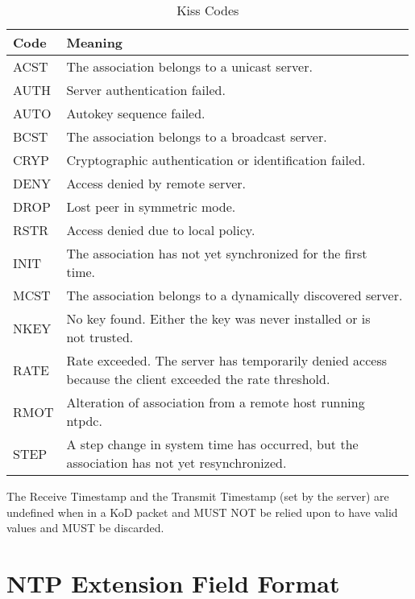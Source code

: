 \begin{table}[htb]
  \center
  \begin{tabular}{| l | l |}
    \hline
    Code & Meaning \\
    \hline
    \hline
    ACST & The association belongs to a unicast server. \\
    AUTH & Server authentication failed. \\
    AUTO & Autokey sequence failed. \\
    BCST & The association belongs to a broadcast server. \\
    CRYP & Cryptographic authentication or identification failed. \\
    DENY & Access denied by remote server. \\
    DROP & Lost peer in symmetric mode. \\
    RSTR & Access denied due to local policy. \\
    INIT & \makecell[l]{The association has not yet synchronized for the first \\ time.} \\
    MCST & The association belongs to a dynamically discovered server.\\
    NKEY & \makecell[l]{No key found. Either the key was never installed or is \\ not trusted.} \\
    RATE & \makecell[l]{Rate exceeded. The server has temporarily denied access \\ because the client exceeded the rate threshold.} \\
    RMOT & \makecell[l]{Alteration of association from a remote host running \\ ntpdc.} \\
    STEP & \makecell[l]{A step change in system time has occurred, but the \\ association has not yet resynchronized.} \\
    \hline
  \end{tabular}
  \caption{Kiss Codes}
  \label{kiss_codes}
\end{table}

The Receive Timestamp and the Transmit Timestamp (set by the server)
are undefined when in a KoD packet and MUST NOT be relied upon to
have valid values and MUST be discarded.

\section{NTP Extension Field Format}
\label{section-7-5}

